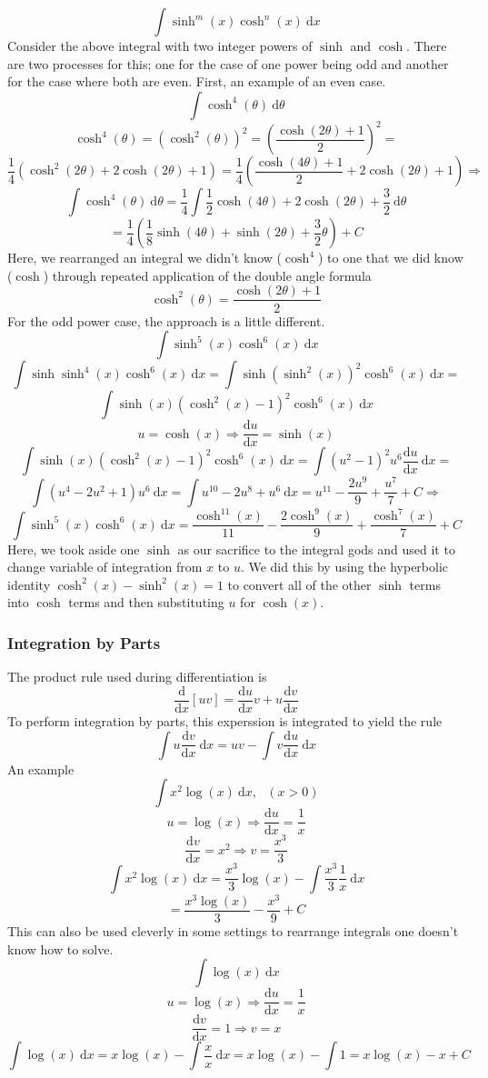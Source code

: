 \documentclass[12pt]{report}
\newcommand{\dx}{\:\mathrm{d}x}
\newcommand{\dd}[2]{\frac{\mathrm{d}#1}{\mathrm{d}#2}}
\newcommand{\derivx}[1]{\frac{\mathrm{d}}{\mathrm{d}x}\left[#1\right]}
\begin{document}
\begin{flushleft}
\[\int \sinh^m(x)\cosh^n(x)\dx\]
Consider the above integral with two integer powers of \(\sinh\) and \(\cosh\).
There are two processes for this; one for the case of one power being odd and
another for the case where both are even. First, an example of an even case.
\[\int \cosh^4(\theta) \:\mathrm{d}\theta\]
\[\cosh^4(\theta) = \left(\cosh^2(\theta)\right)^2 
= \left(\frac{\cosh(2\theta) + 1}{2}\right)^2 = \]
\[\frac{1}{4}\left(\cosh^2(2\theta) + 2\cosh(2\theta) + 1\right) 
= \frac{1}{4}\left(\frac{\cosh(4\theta) + 1}{2} + 2\cosh(2\theta) + 1\right)
\Rightarrow \]
\[\int \cosh^4(\theta) \:\mathrm{d}\theta = \frac{1}{4}\int\frac{1}{2}
\cosh(4\theta) + 2\cosh(2\theta) + \frac{3}{2}  \:\mathrm{d}\theta\]
\[= \frac{1}{4}\left(\frac{1}{8}\sinh(4\theta) + \sinh(2\theta) 
+ \frac{3}{2}\theta\right) + C\]
Here, we rearranged an integral we didn't know (\(\cosh^4\)) to one that we did
know (\(\cosh\)) through repeated application of the double angle formula
\[\cosh^2(\theta) = \frac{\cosh(2\theta) + 1}{2}\]
For the odd power case, the approach is a little different.
\[\int\sinh^5(x)\cosh^6(x)\dx\]
\[\int\sinh\sinh^4(x)\cosh^6(x)\dx = \int\sinh\left(\sinh^2(x)\right)^2
\cosh^6(x)\dx = \]
\[\int\sinh(x)\left(\cosh^2(x) - 1\right)^2\cosh^6(x)\dx\]
\[u = \cosh(x) \Rightarrow \dd{u}{x} = \sinh(x)\]
\[\int\sinh(x)\left(\cosh^2(x) - 1\right)^2\cosh^6(x)\dx 
= \int(u^2 - 1)^2u^6\dd{u}{x} \:\mathrm{d}x = \]
\[\int(u^4 - 2u^2 + 1)u^6 \:\mathrm{d}x = \int u^{10} - 2u^8 + u^6
\:\mathrm{d}x = u^{11} - \frac{2u^9}{9} + \frac{u^7}{7} + C \Rightarrow\]
\[\int\sinh^5(x)\cosh^6(x)\dx = \frac{\cosh^11(x)}{11} 
- \frac{2\cosh^9(x)}{9} + \frac{\cosh^7(x)}{7} + C\]
Here, we took aside one \(\sinh\) as our sacrifice to the integral gods and
used it to change variable of integration from \(x\) to \(u\). We did this by
using the hyperbolic identity \(\cosh^2(x) - \sinh^2(x) = 1\) to convert all of
the other \(\sinh\) terms into \(\cosh\) terms and then substituting \(u\) for
\(\cosh(x)\).

\subsubsection*{Integration by Parts}

The product rule used during differentiation is
\[\derivx{uv} = \dd{u}{x}v + u\dd{v}{x}\]
To perform integration by parts, this experssion is integrated to yield the
rule
\[\int u\dd{v}{x} \dx = uv - \int v\dd{u}{x} \dx\]
An example
\[\int x^2\log(x)\dx, \:\:\: (x > 0)\]
\[u = \log(x) \Rightarrow \dd{u}{x} = \frac{1}{x}\]
\[\dd{v}{x} = x^2 \Rightarrow v = \frac{x^3}{3}\]
\[\int x^2\log(x) \dx = \frac{x^3}{3}\log(x) -\int\frac{x^3}{3}\frac{1}{x}\dx\]
\[= \frac{x^3\log(x)}{3} - \frac{x^3}{9} + C\]
This can also be used cleverly in some settings to rearrange integrals one
doesn't know how to solve.
\[\int\log(x)\dx\]
\[u = \log(x) \Rightarrow \dd{u}{x} = \frac{1}{x}\]
\[\dd{v}{x} = 1 \Rightarrow v = x\]
\[\int\log(x)\dx = x\log(x) - \int \frac{x}{x} \dx = x\log(x) - \int 1 
= x\log(x) - x + C\]

\end{flushleft}
\end{document}
